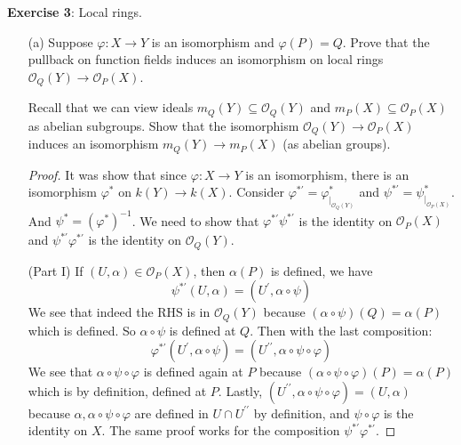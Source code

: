 \documentclass{article}
\begin{document}
\newpage

\textbf{Exercise 3}: Local rings.
    \begin{itemize}
        \item [(a)] Suppose $\varphi : X \rightarrow Y$ is an isomorphism and $\varphi (P) = Q$. Prove that the pullback on function fields induces an isomorphism on local rings $\mathcal{O}_{Q}(Y) \rightarrow \mathcal{O}_{P}(X)$.

        Recall that we can view ideals $m_{Q}(Y) \subseteq \mathcal{O}_{Q}(Y)$ and $m_{P}(X) \subseteq \mathcal{O}_{P}(X)$ as abelian subgroups. Show that the isomorphism $\mathcal{O}_{Q}(Y) \rightarrow \mathcal{O}_{P}(X)$ induces an isomorphism $m_{Q}(Y) \rightarrow m_{P}(X)$ (as abelian groups).
            \begin{proof}
                It was show that since $\varphi: X \rightarrow  Y$ is an isomorphism, there is an isomorphism $\varphi^{*}$ on $k(Y) \rightarrow k(X)$. Consider $\varphi^{*\prime} = \varphi^{*}_{\mid_{ \mathcal{O}_{Q}(Y)}}$ and $\psi^{* \prime} = \psi^{*}_{\mid_{ \mathcal{O}_{P}(X)}}$. And $\psi^{*} = (\varphi^{*})^{-1}$. We need to show that $\varphi^{*\prime}\psi^{* \prime}$ is the identity on $\mathcal{O}_{P}(X)$ and $\psi^{* \prime}\varphi^{* \prime}$ is the identity on $\mathcal{O}_{Q}(Y)$.

                (Part I) If $(U, \alpha) \in \mathcal{ O}_{P}(X)$, then $\alpha ( P)$ is defined, we have
                    \begin{equation*}
                        \psi^{*\prime}(U, \alpha) = (U^{\prime}, \alpha \circ \psi)
                    \end{equation*}
                We see that indeed the RHS is in $ \mathcal{O}_{Q}(Y)$ because $(\alpha \circ \psi) (Q) = \alpha ( P)$ which is defined. So $\alpha \circ \psi$ is defined at $Q$. Then with the last composition:
                    \begin{equation*}
                        \varphi^{* \prime}(U^{\prime}, \alpha \circ  \psi) = (U^{\prime\prime}, \alpha \circ \psi \circ \varphi)
                    \end{equation*}
                We see that $\alpha \circ \psi \circ \varphi$ is defined again at $P$ because $(\alpha \circ \psi \circ \varphi) (P) = \alpha ( P)$ which is by definition, defined at $P$. Lastly, $(U^{\prime\prime}, \alpha \circ \psi \circ \varphi) = (U, \alpha)$ because $\alpha, \alpha \circ \psi \circ \varphi$ are defined in $U \cap U^{\prime\prime}$ by definition, and $\psi \circ \varphi$ is the identity on $X$. The same proof works for the composition $\psi^{* \prime}\varphi^{* \prime}$.


\end{proof}
\end{itemize}
\end{document}

